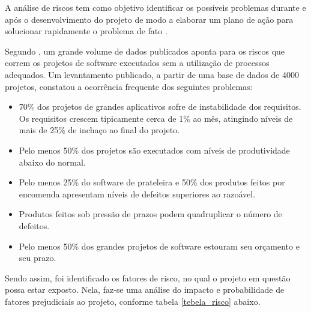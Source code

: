 A análise de riscos tem como objetivo identificar os possíveis problemas durante e após o desenvolvimento do projeto de modo a elaborar um plano de ação para solucionar rapidamente o problema de fato \cite{schmitzanalise}.

Segundo \cite{de2003engenharia}, um grande volume de dados publicados aponta para os riscos que correm os projetos de software executados sem a utilização de processos adequados. Um levantamento publicado, a partir de uma base de dados de 4000 projetos, constatou a ocorrência frequente dos seguintes problemas:

\begin{itemize}
	
	\item 70\% dos projetos de grandes aplicativos sofre de instabilidade dos requisitos. Os requisitos crescem tipicamente cerca de 1\% ao mês, atingindo níveis de mais de 25\% de inchaço ao final
	do projeto.
	
	\item Pelo menos 50\% dos projetos são executados com níveis de produtividade abaixo do normal.
	
	\item Pelo menos 25\% do software de prateleira e 50\% dos produtos feitos por encomenda apresentam níveis de defeitos superiores ao razoável. 
	
	\item Produtos feitos sob pressão de prazos podem quadruplicar o número de defeitos.
	
	\item Pelo menos 50\% dos grandes projetos de software estouram seu orçamento e seu prazo.
	
\end{itemize}

Sendo assim, foi identificado os fatores de risco, no qual o projeto em questão possa estar exposto. Nela, faz-se uma análise do impacto e probabilidade de fatores prejudiciais ao projeto, conforme tabela \ref{tebela_risco} abaixo.

